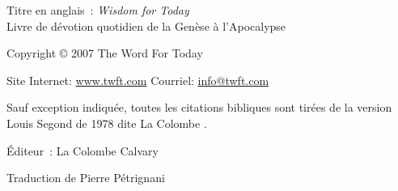\newpage
\mbox{}
\vfill
\noindent Titre en anglais~: \emph{Wisdom for Today}\\
Livre de dévotion quotidien de la Genèse à l'Apocalypse

\noindent Copyright \copyright{} 2007 The Word For Today

\noindent Site Internet: \url{www.twft.com}
\noindent Courriel: \url{info@twft.com}

\noindent Sauf exception indiquée, toutes les citations bibliques sont tirées de
 la version Louis Segond de 1978 dite \og La Colombe \fg{}.


\noindent Éditeur~: La Colombe Calvary

\noindent Traduction de Pierre Pétrignani

